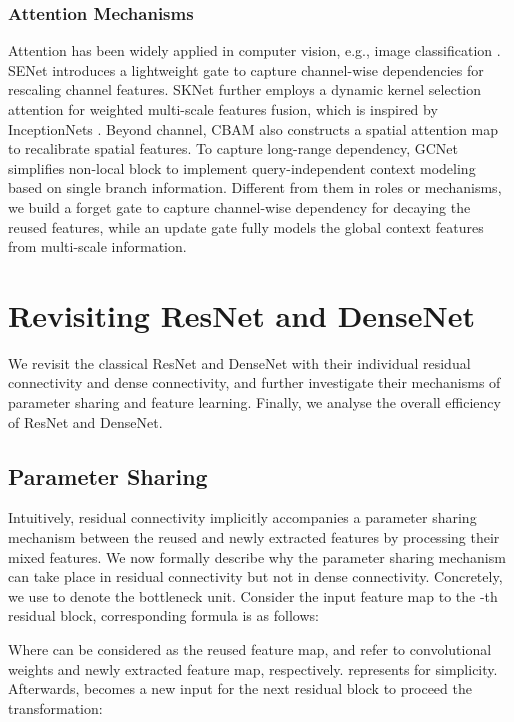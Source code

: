 \documentclass[letterpaper]{article}
\begin{document}
 	\subsubsection{Attention Mechanisms}Attention has been widely applied in computer vision, e.g., image classification \cite{wang2017residual}. SENet \cite{hu2018squeeze} introduces a lightweight gate to capture channel-wise dependencies for rescaling channel features. SKNet \cite{li2019selective} further employs a dynamic kernel selection attention for weighted multi-scale features fusion, which is inspired by InceptionNets \cite{szegedy2017inception}. Beyond channel, CBAM \cite{woo2018cbam} also constructs a spatial attention map to recalibrate spatial features. To capture long-range dependency, GCNet \cite{cao2019gcnet} simplifies non-local block \cite{wang2018non} to implement query-independent context modeling based on single branch information. Different from them in roles or mechanisms, we build a forget gate to capture channel-wise dependency for decaying the reused features, while an update gate fully models the global context features from multi-scale information.
 	\section{Revisiting ResNet and DenseNet}
 	We revisit the classical ResNet and DenseNet with their individual residual connectivity and dense connectivity, and further investigate their mechanisms of parameter sharing and feature learning. Finally, we analyse the overall efficiency of ResNet and DenseNet.    
 	
 	\subsection{Parameter Sharing}
 	Intuitively, residual connectivity implicitly accompanies a parameter sharing mechanism between the reused and newly extracted features by processing their mixed features. We now formally describe why the parameter sharing mechanism can take place in residual connectivity but not in dense connectivity. Concretely, we use  to denote the bottleneck unit. Consider the input feature map  to the -th residual block, corresponding formula is as follows:
 	
 	Where  can be considered as the reused feature map,  and  refer to convolutional weights and newly extracted feature map, respectively.  represents  for simplicity. Afterwards,  becomes a new input for the next residual block to proceed the transformation:
 	
\end{document}
